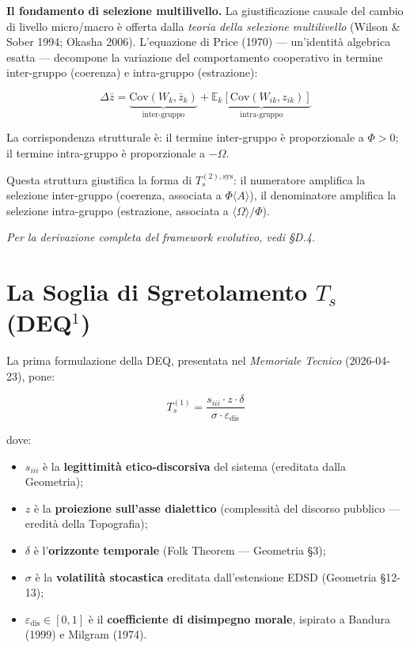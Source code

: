 \Proved{} \textbf{Il fondamento di selezione multilivello.} La
giustificazione causale del cambio di livello micro/macro è offerta
dalla \textit{teoria della selezione multilivello} (Wilson \& Sober
1994; Okasha 2006). L'equazione di Price (1970) --- un'identità
algebrica esatta --- decompone la variazione del comportamento cooperativo
in termine inter-gruppo (coerenza) e intra-gruppo (estrazione):

\[
\Delta\bar{z} = \underbrace{\mathrm{Cov}(W_k,\bar{z}_k)}_{\text{inter-gruppo}} + \underbrace{\mathbb{E}_k\!\left[\mathrm{Cov}(W_{ik},z_{ik})\right]}_{\text{intra-gruppo}} \tag{Price 1970}
\]

\Hypoth{} La corrispondenza strutturale è: il termine inter-gruppo
è proporzionale a \(\Phi > 0\); il termine intra-gruppo è proporzionale
a \(-\Omega\).

Questa struttura giustifica la forma di \(T_s^{(2),\text{sys}}\): il
numeratore amplifica la selezione inter-gruppo (coerenza, associata a
\(\Phi\langle A\rangle\)), il denominatore amplifica la selezione
intra-gruppo (estrazione, associata a \(\langle\Omega\rangle/\Phi\)).

\textit{Per la derivazione completa del framework evolutivo, vedi §D.4.}



\section{\texorpdfstring{La Soglia di Sgretolamento \(T_s\)
(DEQ$^1$)}{La Soglia di Sgretolamento T\_s (DEQ$^1$)}}\label{la-soglia-di-sgretolamento-t_s-dequxb9}

La prima formulazione della DEQ, presentata nel \emph{Memoriale Tecnico}
(2026-04-23), pone:

\[
T_s^{(1)} = \frac{s_{iii} \cdot z \cdot \delta}{\sigma \cdot \varepsilon_{\text{dis}}}
\]

dove:

\begin{itemize}
\tightlist
\item
  \(s_{iii}\) è la \textbf{legittimità etico-discorsiva} del sistema
  (ereditata dalla Geometria);
\item
  \(z\) è la \textbf{proiezione sull'asse dialettico} (complessità del
  discorso pubblico --- eredità della Topografia);
\item
  \(\delta\) è l'\textbf{orizzonte temporale} (Folk Theorem ---
  Geometria \S{}3);
\item
  \(\sigma\) è la \textbf{volatilità stocastica} ereditata
  dall'estensione EDSD (Geometria \S{}12-13);
\item
  \(\varepsilon_{\text{dis}} \in [0,1]\) è il \textbf{coefficiente di
  disimpegno morale}, ispirato a Bandura (1999) e Milgram (1974).
\end{itemize}

